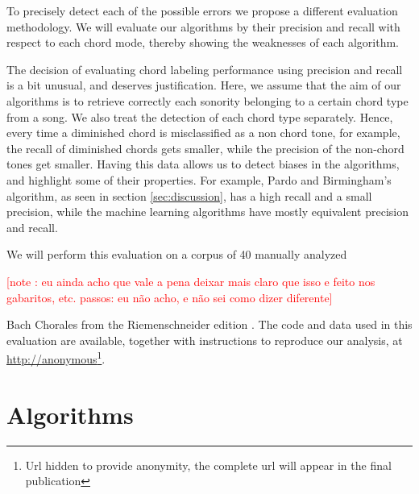 \documentclass{article}
\newcounter{notecounter}
\newcommand{\note}[1]{
  \addtocounter{notecounter}{1}
  \textcolor{red}{[note \arabic{notecounter}: #1]}
}
\begin{document}
To precisely detect each of the possible errors we propose a different
evaluation methodology. We will evaluate our algorithms by their
precision and recall with respect to each chord mode, thereby showing
the weaknesses of each algorithm.

The decision of evaluating chord labeling performance using precision
and recall is a bit unusual, and deserves justification. Here, we
assume that the aim of our algorithms is to retrieve correctly each
sonority belonging to a certain chord type from a song. We also treat
the detection of each chord type separately. Hence, every time a
diminished chord is misclassified as a non chord tone, for example,
the recall of diminished chords gets smaller, while the precision of
the non-chord tones get smaller. Having this data allows us to detect
biases in the algorithms, and highlight some of their properties. For
example, Pardo and Birmingham's algorithm, as seen in section
\ref{sec:discussion}, has a high recall and a small precision, while
the machine learning algorithms have mostly equivalent precision and
recall.

We will perform this evaluation on a corpus of 40 manually analyzed
\note{eu ainda acho que vale a pena deixar mais claro que isso e feito
  nos gabaritos, etc. passos: eu não acho, e não sei como dizer diferente}
Bach Chorales from the Riemenschneider edition \cite{bach:371}. The
code and data used in this evaluation are available, together with
instructions to reproduce our analysis, at
\url{http://anonymous}\footnote{Url hidden to provide anonymity, the
  complete url will appear in the final publication}.

\section{Algorithms}
\label{sec:algorithms}
\end{document}
